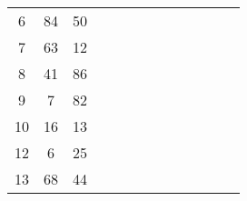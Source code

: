 \begin{table}[tb]
\begin{tabular}{ccccccccccccc}
		\multicolumn{1}{|c|}{6}  & \multicolumn{1}{c|}{84} & \multicolumn{1}{c|}{50} &                         &                         &                         &                         &                         &                         &                         &                         &                         &                         \\ \cline{1-3}
		\multicolumn{1}{|c|}{7}  & \multicolumn{1}{c|}{63} & \multicolumn{1}{c|}{12} &                         &                         &                         &                         &                         &                         &                         &                         &                         &                         \\ \cline{1-3}
		\multicolumn{1}{|c|}{8}  & \multicolumn{1}{c|}{41} & \multicolumn{1}{c|}{86} &                         &                         &                         &                         &                         &                         &                         &                         &                         &                         \\ \cline{1-3}
		\multicolumn{1}{|c|}{9}  & \multicolumn{1}{c|}{7}  & \multicolumn{1}{c|}{82} &                         &                         &                         &                         &                         &                         &                         &                         &                         &                         \\ \cline{1-3}
		\multicolumn{1}{|c|}{10} & \multicolumn{1}{c|}{16} & \multicolumn{1}{c|}{13} &                         &                         &                         &                         &                         &                         &                         &                         &                         &                         \\ \cline{1-3}
		\multicolumn{1}{|c|}{12} & \multicolumn{1}{c|}{6}  & \multicolumn{1}{c|}{25} &                         &                         &                         &                         &                         &                         &                         &                         &                         &                         \\ \cline{1-3}
		\multicolumn{1}{|c|}{13} & \multicolumn{1}{c|}{68} & \multicolumn{1}{c|}{44} &                         &                         &                         &                         &                         &                         &                         &                         &                         &                         \\ \cline{1-3}

\end{tabular}
\end{table}
